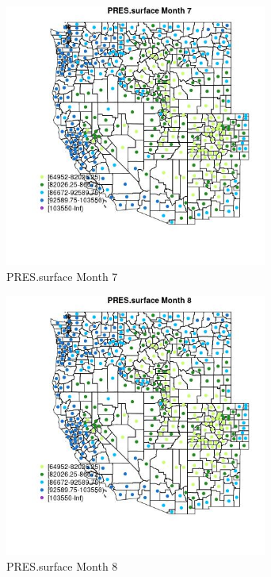 \begin{figure} 
\centering  
\includegraphics[width=0.77\textwidth]{Code_Outputs/df_report_ML_predictors_CountyCentroid_Locations_Dates_2008-01-01to2018-12-31_MapObsMo7PRESsurface.jpg} 
\caption{\label{fig:df_report_ML_predictors_CountyCentroid_Locations_Dates_2008-01-01to2018-12-31MapObsMo7PRESsurface}PRES.surface Month 7} 
\end{figure} 
 

\clearpage 

\begin{figure} 
\centering  
\includegraphics[width=0.77\textwidth]{Code_Outputs/df_report_ML_predictors_CountyCentroid_Locations_Dates_2008-01-01to2018-12-31_MapObsMo8PRESsurface.jpg} 
\caption{\label{fig:df_report_ML_predictors_CountyCentroid_Locations_Dates_2008-01-01to2018-12-31MapObsMo8PRESsurface}PRES.surface Month 8} 
\end{figure} 
 

